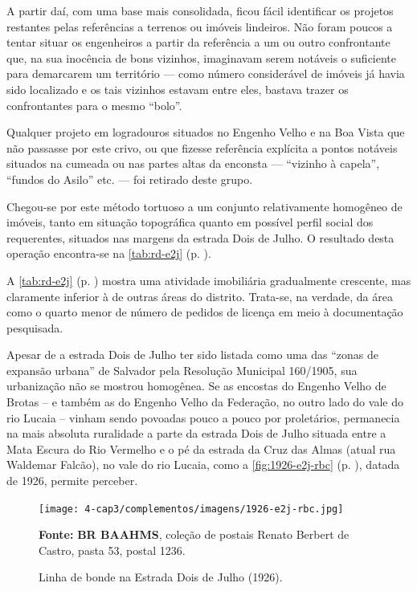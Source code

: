 A partir daí, com uma base mais consolidada, ficou fácil identificar os projetos restantes pelas referências a terrenos ou imóveis lindeiros. Não foram poucos a tentar situar os engenheiros a partir da referência a um ou outro confrontante que, na sua inocência de bons vizinhos, imaginavam serem notáveis o suficiente para demarcarem um território --- como número considerável de imóveis já havia sido localizado e os tais vizinhos estavam entre eles, bastava trazer os confrontantes para o mesmo ``bolo''. 

Qualquer projeto em logradouros situados no Engenho Velho e na Boa Vista que não passasse por este crivo, ou que fizesse referência explícita a pontos notáveis situados na cumeada ou nas partes altas da enconsta --- ``vizinho à capela'', ``fundos do Asilo'' etc. --- foi retirado deste grupo. 

Chegou-se por este método tortuoso a um conjunto relativamente homogêneo de imóveis, tanto em situação topográfica quanto em possível perfil social dos requerentes, situados nas margens da estrada Dois de Julho. O resultado desta operação encontra-se na \autoref{tab:rd-e2j} (p. \pageref{tab:rd-e2j}).





A \autoref{tab:rd-e2j} (p. \pageref{tab:rd-e2j}) mostra uma atividade imobiliária gradualmente crescente, mas claramente inferior à de outras áreas do distrito. Trata-se, na verdade, da área como o quarto menor de número de pedidos de licença em meio à documentação pesquisada. 

Apesar de a estrada Dois de Julho ter sido listada como uma das ``zonas de expansão urbana'' de Salvador pela Resolução Municipal 160/1905, sua urbanização não se mostrou homogênea. Se as encostas do Engenho Velho de Brotas -- e também as do Engenho Velho da Federação, no outro lado do vale do rio Lucaia -- vinham sendo povoadas pouco a pouco por proletários, permanecia na mais absoluta ruralidade a parte da estrada Dois de Julho situada entre a Mata Escura do Rio Vermelho e o pé da estrada da Cruz das Almas (atual rua Waldemar Falcão), no vale do rio Lucaia, como a \autoref{fig:1926-e2j-rbc} (p. \pageref{fig:1926-e2j-rbc}), datada de 1926, permite perceber. 

\begin{figure}[!h]
\centering
\caption{Linha de bonde na Estrada Dois de Julho (1926).}
\texttt{[image: 4-cap3/complementos/imagens/1926-e2j-rbc.jpg]}{\footnotesize \par \textbf{Fonte:} \textbf{BR BAAHMS}, coleção de postais Renato Berbert de Castro, pasta 53, postal 1236.}
\label{fig:1926-e2j-rbc}
\end{figure}

